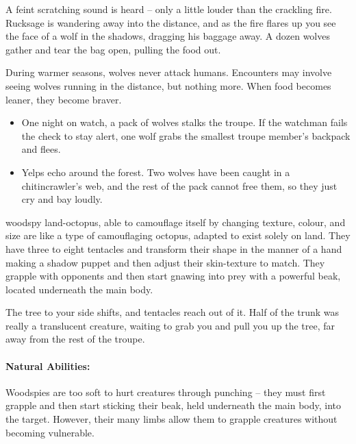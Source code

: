 \begin{multicols}{2}
\begin{boxtext}
  A feint scratching sound is heard -- only a little louder than the crackling fire.
  Rucksage is wandering away into the distance, and as the fire flares up you see the face of a wolf in the shadows, dragging his baggage away.
  A dozen wolves gather and tear the bag open, pulling the food out.
\end{boxtext}


\showEnc
During warmer seasons, wolves never attack humans.
Encounters may involve seeing wolves running in the distance, but nothing more.
When food becomes leaner, they become braver.

\begin{itemize}
  \item
  One night on watch, a pack of wolves stalks the troupe.
  If the watchman fails the  check to stay alert, one wolf grabs the smallest troupe member's backpack and flees.
  \item
  Yelps echo around the forest.
  Two wolves have been caught in a chitincrawler's web, and the rest of the pack cannot free them, so they just cry and bay loudly.
\end{itemize}

  {woodspy}%
  {land-octopus, able to camouflage itself by changing texture, colour, and size}%
are like a type of camouflaging octopus, adapted to exist solely on land.
They have three to eight tentacles and transform their shape in the manner of a hand making a shadow puppet and then adjust their skin-texture to match.
They grapple with opponents and then start gnawing into prey with a powerful beak, located underneath the main body.

\begin{boxtext}
  The tree to your side shifts, and tentacles reach out of it.
  Half of the trunk was really a translucent creature, waiting to grab you and pull you up the tree, far away from the rest of the troupe.
\end{boxtext}

\paragraph{Natural Abilities:} Woodspies are too soft to hurt creatures through punching -- they must first grapple and then start sticking their beak, held underneath the main body, into the target.
However, their many limbs allow them to grapple creatures without becoming vulnerable.%


\end{multicols}
